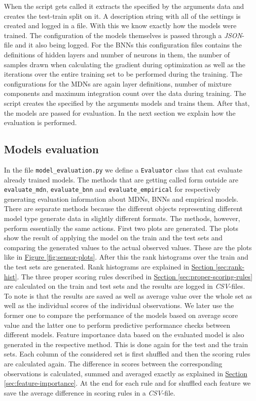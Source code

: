 \documentclass[12pt,a4paper,twoside]{scrartcl}
\numberwithin{equation}{section}
\newcommand{\reffig}[1]{\hyperref[#1]{Figure \ref*{#1}}}
\newcommand{\refsec}[1]{\hyperref[#1]{Section \ref*{#1}}}
\begin{document}
When the script gets called it extracts the specified by the arguments data and creates the test-train split on it. A description string with all of the settings is created and logged in a file. With this we know exactly how the models were trained. The configuration of the models themselves is passed through a \emph{JSON}-file and it also being logged. For the BNNs this configuration files contains the definitions of hidden layers and number of neurons in them, the number of samples drawn when calculating the gradient during optimization as well as the iterations over the entire training set to be performed during the training. The configurations for the MDNs are again layer definitions, number of mixture components and maximum integration count over the data during training. The script creates the specified by the arguments models and trains them. After that, the models are passed for evaluation. In the next section we explain how the evaluation is performed.
\subsection{Models evaluation}\label{sec:models-eval}
In the file \texttt{model\_evaluation.py} we define a \texttt{Evaluator} class that cat evaluate already trained models. The methods that are getting called form outside are \texttt{evaluate\_mdn}, \texttt{evaluate\_bnn} and \texttt{evaluate\_empirical} for respectively generating evaluation information about MDNs, BNNs and empirical models. There are separate methods because the different objects representing different model type generate data in slightly different formats. The methods, however, perform essentially the same actions. First two plots are generated. The plots show the result of applying the model on the train and the test sets and comparing the generated values to the actual observed values. These are the plots like in \reffig{fig:sensor-plots}. After this the rank histograms over the train and the test sets are generated. Rank histograms are explained in \refsec{sec:rank-hist}. The three proper scoring rules described in \refsec{sec:proper-scoring-rules} are calculated on the train and test sets and the results are logged in \emph{CSV}-files. To note is that the results are saved as well as average value over the whole set as well as the individual scores of the individual observations. We later use the former one to compare the performance of the models based on average score value and the latter one to perform predictive performance checks between different models. Feature importance data based on the evaluated model is also generated in the respective method. This is done again for the test and the train sets. Each column of the considered set is first shuffled and then the scoring rules are calculated again. The difference in scores between the corresponding observations is calculated, summed and averaged exactly as explained in \refsec{sec:feature-importance}. At the end for each rule and for shuffled each feature we save the average difference in scoring rules in a \emph{CSV}-file.
\end{document}
